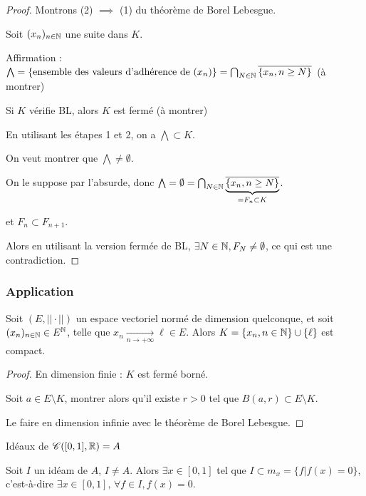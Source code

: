 \begin{proof}
    Montrons (2) $\implies$ (1) du théorème de Borel Lebesgue.

    Soit $(x_n)_{n \in \mathbb{N}}$ une suite dans $K$. 


    Affirmation : $\bigwedge = \{ \text{ensemble des valeurs d'adhérence de } (x_n) \} = \bigcap_{N \in \mathbb{N}} \overline{\{x_n, n \geq N\}}$ (à montrer)

    
     Si $K$ vérifie BL, alors $K$ est fermé (à montrer)

    En utilisant les étapes 1 et 2, on a $\bigwedge \subset K$.

     On veut montrer que $\bigwedge \neq \emptyset$.

    On le suppose par l'absurde, donc $\bigwedge = \emptyset = \bigcap_{N \in \mathbb{N}} \underbrace{\overline{\{x_n, n \geq N\}}}_{= F_n \subset K}$.

    et $F_n \subset F_{n + 1}$.

    Alors en utilisant la version fermée de BL, $\exists N \in \mathbb{N}, F_N \neq \emptyset$, ce qui est une contradiction.
\end{proof}

\subsubsection{Application }

Soit $(E, ||\cdot||)$ un espace vectoriel normé de dimension quelconque, et soit $(x_n)_{n \in \mathbb{N}} \in E^{\mathbb{N}}$, telle que 
$x_n \xrightarrow[n \to + \infty]{} \ell \in E$. Alors $K = \{x_n, n \in \mathbb{N}\} \cup \{\ell\}$ est compact.

\begin{proof}
    En dimension finie : $K$ est fermé borné. 

    Soit $a \in E \setminus K$, montrer alors qu'il existe $r > 0$ tel que $B(a, r) \subset E \setminus K$.

    Le faire en dimension infinie avec le théorème de Borel Lebesgue.
\end{proof}

Idéaux de $\mathscr C([0, 1], \mathbb{R}) = A$

\begin{theoreme}
    Soit $I$ un idéam de $A$, $I \neq A$. Alors $\exists x \in [0, 1]$ tel que $I \subset m_x = \{f | f(x) = 0\}$, 
    c'est-à-dire $\exists x \in [0, 1], \, \forall f \in I, f(x) = 0$.
\end{theoreme}

